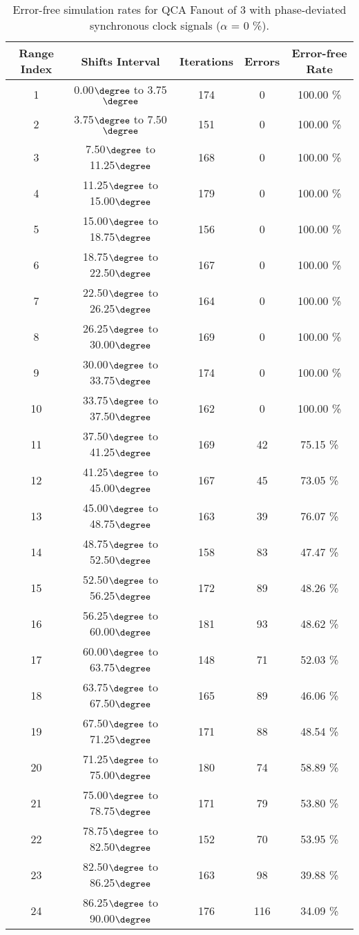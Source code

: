 \flushleft
\begin{table}[h]
\begin{center}
\caption{Error-free simulation rates for QCA Fanout of 3 with phase-deviated synchronous clock signals ($\alpha$ = 0 \%).}
\begin{tabular}{|c|c|c|c|c|}
\hline
\textbf{Range Index} & \textbf{Shifts Interval} & \textbf{Iterations} & \textbf{Errors} & \textbf{Error-free Rate} \\
\hline
1  &  0.00$\degree$ to  3.75$\degree$ & 174 &  0 & 100.00 \% \\
\hline
2  &  3.75$\degree$ to  7.50$\degree$ & 151 &  0 & 100.00 \% \\
\hline
3  &  7.50$\degree$ to 11.25$\degree$ & 168 &  0 & 100.00 \% \\
\hline
4  & 11.25$\degree$ to 15.00$\degree$ & 179 &  0 & 100.00 \% \\
\hline
5  & 15.00$\degree$ to 18.75$\degree$ & 156 &  0 & 100.00 \% \\
\hline
6  & 18.75$\degree$ to 22.50$\degree$ & 167 &  0 & 100.00 \% \\
\hline
7  & 22.50$\degree$ to 26.25$\degree$ & 164 &  0 & 100.00 \% \\
\hline
8  & 26.25$\degree$ to 30.00$\degree$ & 169 &  0 & 100.00 \% \\
\hline
9  & 30.00$\degree$ to 33.75$\degree$ & 174 &  0 & 100.00 \% \\
\hline
10 & 33.75$\degree$ to 37.50$\degree$ & 162 &  0 & 100.00 \% \\
\hline
11 & 37.50$\degree$ to 41.25$\degree$ & 169 & 42 &  75.15 \% \\
\hline
12 & 41.25$\degree$ to 45.00$\degree$ & 167 & 45 &  73.05 \% \\
\hline
13 & 45.00$\degree$ to 48.75$\degree$ & 163 & 39 &  76.07 \% \\
\hline
14 & 48.75$\degree$ to 52.50$\degree$ & 158 & 83 &  47.47 \% \\
\hline
15 & 52.50$\degree$ to 56.25$\degree$ & 172 & 89 &  48.26 \% \\
\hline
16 & 56.25$\degree$ to 60.00$\degree$ & 181 & 93 &  48.62 \% \\
\hline
17 & 60.00$\degree$ to 63.75$\degree$ & 148 & 71 &  52.03 \% \\
\hline
18 & 63.75$\degree$ to 67.50$\degree$ & 165 & 89 &  46.06 \% \\
\hline
19 & 67.50$\degree$ to 71.25$\degree$ & 171 & 88 &  48.54 \% \\
\hline
20 & 71.25$\degree$ to 75.00$\degree$ & 180 & 74 &  58.89 \% \\
\hline
21 & 75.00$\degree$ to 78.75$\degree$ & 171 & 79 &  53.80 \% \\
\hline
22 & 78.75$\degree$ to 82.50$\degree$ & 152 & 70 &  53.95 \% \\
\hline
23 & 82.50$\degree$ to 86.25$\degree$ & 163 & 98 &  39.88 \% \\
\hline
24 & 86.25$\degree$ to 90.00$\degree$ & 176 & 116 &  34.09 \% \\
\hline


\end{tabular}
\end{center}
\end{table}
